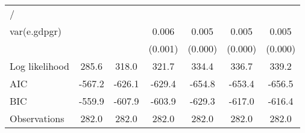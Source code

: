 \begin{table}[htbp]
\begin{tabular}{l*{6}{c}}
\hline
/                   &                     &                     &                     &                     &                     &                     \\
var(e.gdpgr)        &                     &                     &       0.006\sym{***}&       0.005\sym{***}&       0.005\sym{***}&       0.005\sym{***}\\
                    &                     &                     &     (0.001)         &     (0.000)         &     (0.000)         &     (0.000)         \\
\hline
Log likelihood      &       285.6         &       318.0         &       321.7         &       334.4         &       336.7         &       339.2         \\
AIC                 &      -567.2         &      -626.1         &      -629.4         &      -654.8         &      -653.4         &      -656.5         \\
BIC                 &      -559.9         &      -607.9         &      -603.9         &      -629.3         &      -617.0         &      -616.4         \\
Observations        &       282.0         &       282.0         &       282.0         &       282.0         &       282.0         &       282.0         \\
\hline\hline
\end{tabular}
\end{table}
